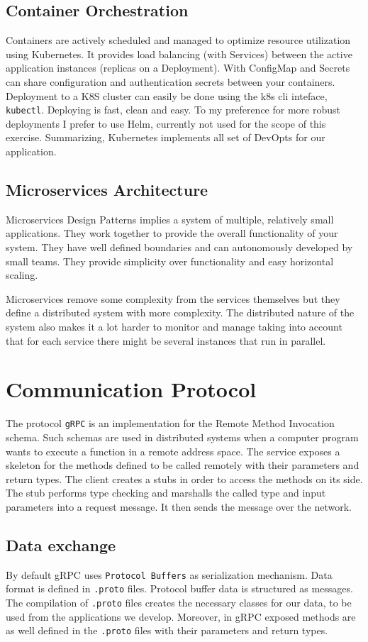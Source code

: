 \documentclass[a4paper,10pt]{article}
\begin{document}
\subsection{Container Orchestration}
Containers are actively scheduled and managed to optimize resource utilization using Kubernetes. It provides load balancing (with Services) between the active application instances (replicas on a Deployment). With ConfigMap and Secrets can share configuration and authentication secrets between your containers.
Deployment to a K8S cluster can easily be done using the k8s cli inteface, \texttt{kubectl}. Deploying is fast, clean and easy. To my preference for more robust deployments I prefer to use Helm, 
currently not used for the scope of this exercise. Summarizing, Kubernetes implements all set of DevOpts for our application.


\subsection{Microservices Architecture}
Microservices Design Patterns implies  a system of multiple, relatively small applications. They work together to provide the overall functionality of your system. They 
have well defined boundaries and can autonomously developed by small teams. They provide 
simplicity over functionality and easy horizontal scaling.

Microservices remove some complexity from the services themselves but they define a distributed system with more complexity. The distributed nature of the system also makes it a lot harder to monitor and manage taking into account that for each service there might be several instances that run in parallel.




\section{Communication Protocol}
The protocol \texttt{gRPC} is an implementation for the Remote Method Invocation schema. Such schemas are used in distributed systems when a computer program wants to execute a function in a remote address space. The service exposes a skeleton for the methods 
defined to be called remotely with their parameters and return types. The client 
creates a stubs in order to access the methods on its side. The stub performs type 
checking and marshalls the called type and input parameters into a request message. 
It then sends the message over the network.
\newpage
\subsection{Data exchange}
By default gRPC uses \texttt{Protocol Buffers} as serialization mechanism. Data 
format is defined in \texttt{.proto} files. Protocol buffer data is structured as messages. The compilation of \texttt{.proto} files creates the necessary classes 
for our data, to be used from the applications we develop. Moreover, in gRPC exposed 
methods are as well defined in the \texttt{.proto} files with their parameters and 
return types.
\end{document}
